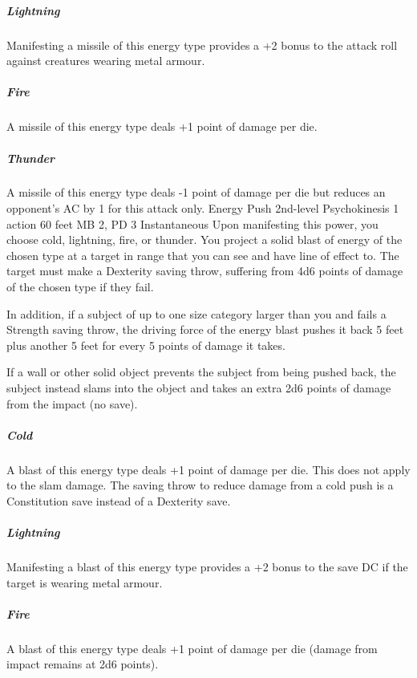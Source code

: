 \subparagraph{Lightning} Manifesting a missile of this energy
type provides a +2 bonus to the attack roll against creatures
wearing metal armour.

\subparagraph{Fire} A missile of this energy type deals +1
point of damage per die.

\subparagraph{Thunder} A missile of this energy type deals
-1 point of damage per die but reduces an opponent's AC by
1 for this attack only.
\DndPowerHeader%
    {Energy Push\label{pwr:energy_push}}
    {2nd-level Psychokinesis}
    {1 action}
    {60 feet}
    {MB 2, PD 3}
    {Instantaneous}
Upon manifesting this power, you choose cold,
lightning, fire, or thunder. You project a solid blast of
energy of the chosen type at a target in range that you
can see and have line of effect to. The target must make
a Dexterity saving throw, suffering from 4d6 points of damage
of the chosen type if they fail.

In addition, if a subject
of up to one size category larger than you and fails a Strength
saving throw, the driving force of the energy blast pushes
it back 5 feet plus another 5 feet for every 5 points of
damage it takes.

If a wall or other solid object prevents
the subject from being pushed back, the subject instead
slams into the object and takes an extra 2d6 points of damage
from the impact (no save).

\subparagraph{Cold}
A blast
of this energy type deals +1 point of damage per die.
This does not apply to the slam damage.
The saving throw to reduce damage from a cold push
is a Constitution save instead of a Dexterity save.

\subparagraph{Lightning}
Manifesting a blast of this energy type provides a +2 bonus
to the save DC if the target is wearing metal armour.

\subparagraph{Fire}
A blast of this energy type deals +1
point of damage per die (damage from impact remains at
2d6 points).

